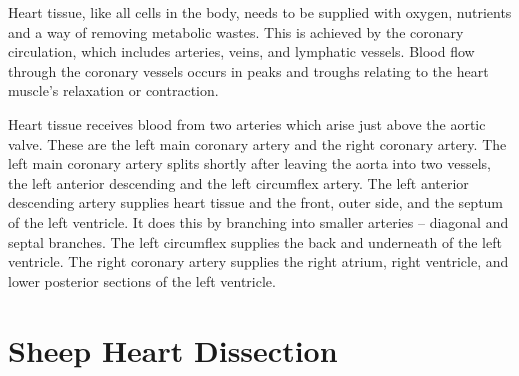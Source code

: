 \documentclass[]{book}
\theoremstyle{definition}
\theoremstyle{definition}
\theoremstyle{definition}
\theoremstyle{remark}
\begin{document}
Heart tissue, like all cells in the body, needs to be supplied with
oxygen, nutrients and a way of removing metabolic wastes. This is
achieved by the coronary circulation, which includes arteries, veins,
and lymphatic vessels. Blood flow through the coronary vessels occurs in
peaks and troughs relating to the heart muscle's relaxation or
contraction.

Heart tissue receives blood from two arteries which arise just above the
aortic valve. These are the left main coronary artery and the right
coronary artery. The left main coronary artery splits shortly after
leaving the aorta into two vessels, the left anterior descending and the
left circumflex artery. The left anterior descending artery supplies
heart tissue and the front, outer side, and the septum of the left
ventricle. It does this by branching into smaller arteries -- diagonal
and septal branches. The left circumflex supplies the back and
underneath of the left ventricle. The right coronary artery supplies the
right atrium, right ventricle, and lower posterior sections of the left
ventricle.

\section{Sheep Heart Dissection}\label{sheep-heart-dissection}
\end{document}
